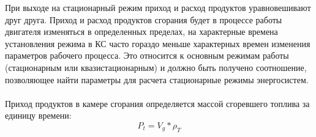 \documentclass{article}
\begin{document}
При выходе на стационарный режим приход и расход продуктов уравновешивают друг друга. Приход и расход продуктов сгорания будет в процессе работы двигателя изменяться в определенных пределах, на характерные времена установления режима в КС часто гораздо меньше характерных времен изменения параметров рабочего процесса. Это относится к основным режимам работы (стационарным или квазистационарным) и должно быть получено соотношение, позволяющее найти параметры для расчета стационарные режимы энергосистем.\\
~\\
Приход продуктов в камере сгорания определяется массой сгоревшего топлива за единицу времени: \\
\begin{equation}\label{eq:fourierrow} 
P_t = V_g * \rho_T 
\end{equation}\\
\end{document}
